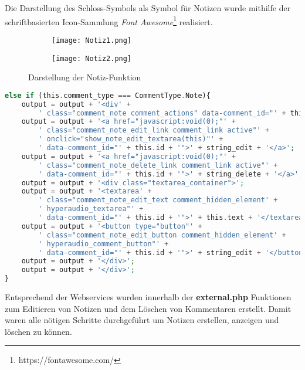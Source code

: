 Die Darstellung des Schloss-Symbols als Symbol für Notizen wurde mithilfe der schriftbasierten Icon-Sammlung \textit{Font Awesome}\footnote{https://fontawesome.com/} realisiert.

\begin{figure}[h!]
\begin{subfigure}[c]{0.5\textwidth}
\texttt{[image: Notiz1.png]}
\label{fig:Notiz1}
\end{subfigure}%
\begin{subfigure}[c]{0.5\textwidth}
\texttt{[image: Notiz2.png]}
\label{fig:Notiz2}
\end{subfigure}
\caption{Darstellung der Notiz-Funktion}
\label{fig:Notiz}
\end{figure}

\begin{lstlisting}[language=php,
             linewidth=\textwidth,
             caption={Ausschnitt der \textbf{hyperaudio.js} in der 6. Iteration},
             label={lst:it6:hyperaudio}]
else if (this.comment_type === CommentType.Note){
    output = output + '<div' +
        ' class="comment_note comment_actions" data-comment_id="' + this.id + '">';
    output = output + '<a href="javascript:void(0);"' +
        ' class="comment_note_edit_link comment_link active"' +
        ' onclick="show_note_edit_textarea(this)"' +
        ' data-comment_id="' + this.id + '">' + string_edit + '</a>';
    output = output + '<a href="javascript:void(0);"' +
        ' class="comment_note_delete_link comment_link active"' +
        ' data-comment_id="' + this.id + '">' + string_delete + '</a>';
    output = output + '<div class="textarea_container">';
    output = output + '<textarea' +
        ' class="comment_note_edit_text comment_hidden_element' +
        ' hyperaudio_textarea"' +
        ' data-comment_id="' + this.id + '">' + this.text + '</textarea>';
    output = output + '<button type="button"' +
        ' class="comment_note_edit_button comment_hidden_element' +
        ' hyperaudio_comment_button"' +
        ' data-comment_id="' + this.id + '">' + string_edit + '</button>';
    output = output + '</div>';
    output = output + '</div>';
}		
\end{lstlisting}

Entsprechend der Webservices wurden innerhalb der \textbf{external.php} Funktionen zum Editieren von Notizen und dem Löschen von Kommentaren erstellt. Damit waren alle nötigen Schritte durchgeführt um Notizen erstellen, anzeigen und löschen zu können.


